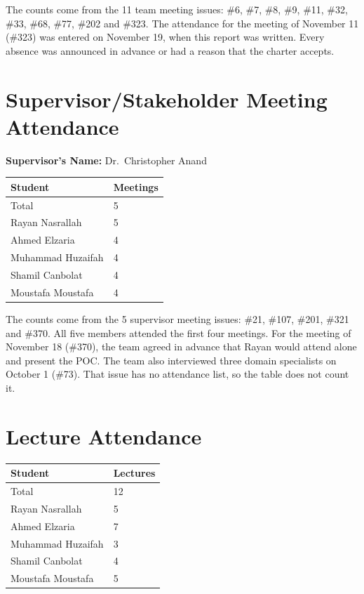 \documentclass{article}
\begin{document}
The counts come from the 11 team meeting issues: \#6, \#7, \#8, \#9, \#11,
\#32, \#33, \#68, \#77, \#202 and \#323. The attendance for the meeting of
November 11 (\#323) was entered on November 19, when this report was
written. Every absence was announced in advance or had a reason that the
charter accepts.

\section{Supervisor/Stakeholder Meeting Attendance}

\noindent \textbf{Supervisor's Name: } Dr.~Christopher Anand

\begin{table}[H]
\centering
\begin{tabular}{ll}
\toprule
\textbf{Student} & \textbf{Meetings}\\
\midrule
Total & 5\\
Rayan Nasrallah & 5\\
Ahmed Elzaria & 4\\
Muhammad Huzaifah & 4\\
Shamil Canbolat & 4\\
Moustafa Moustafa & 4\\
\bottomrule
\end{tabular}
\end{table}

The counts come from the 5 supervisor meeting issues: \#21, \#107, \#201,
\#321 and \#370. All five members attended the first four meetings. For the
meeting of November 18 (\#370), the team agreed in advance that Rayan would
attend alone and present the POC. The team also interviewed three domain
specialists on October 1 (\#73). That issue has no attendance list, so the
table does not count it.

\section{Lecture Attendance}

\begin{table}[H]
\centering
\begin{tabular}{ll}
\toprule
\textbf{Student} & \textbf{Lectures}\\
\midrule
Total & 12\\
Rayan Nasrallah & 5\\
Ahmed Elzaria & 7\\
Muhammad Huzaifah & 3\\
Shamil Canbolat & 4\\
Moustafa Moustafa & 5\\
\bottomrule
\end{tabular}
\end{table}
\end{document}
